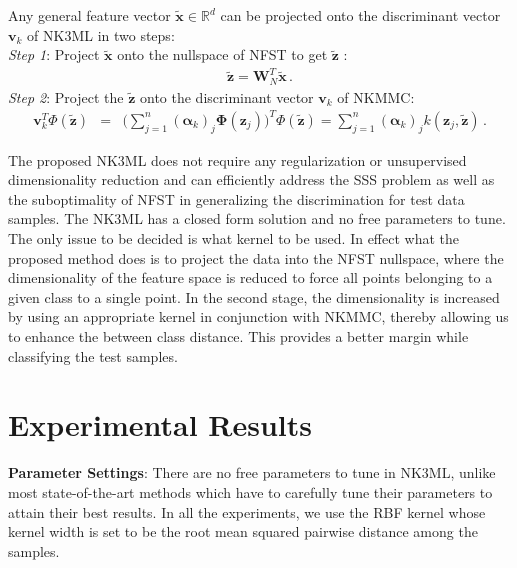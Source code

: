 \documentclass[runningheads]{llncs}
\begin{document}
Any general feature vector $\widetilde{\mathbf{x}} \in \mathbb{R}^d$ can be projected onto the discriminant vector $\mathbf{v}_k$ of NK3ML in two steps:\\
\textit{Step 1}: Project $\widetilde{\mathbf{x}}$ onto the nullspace of NFST to get $\widetilde{\mathbf{z}}$ : 
\begin{eqnarray}
\widetilde{\mathbf{z}} = \mathbf{W}^T_{N} \widetilde{\mathbf{x}} \,.
\end{eqnarray}
\textit{Step 2}: Project the $\widetilde{\mathbf{z}} $ onto the discriminant vector $\mathbf{v}_k$ of NKMMC:
\begin{eqnarray}
\mathbf{v}_k^T \Phi(\widetilde{\mathbf{z}}) &=& \Big( \sum\limits_{j = 1}^{n} (\bm{\alpha}_{k})_j \mathbf{\Phi}(\mathbf{z}_j)\Big)^T \Phi(\widetilde{\mathbf{z}})
= \sum\limits_{j = 1}^{n} (\bm{\alpha}_{k})_j  k(\mathbf{z}_j,\widetilde{\mathbf{z}}) \,.
\end{eqnarray}

The proposed NK3ML does not require any regularization or unsupervised dimensionality reduction and can efficiently address the SSS problem as well as the suboptimality of NFST in generalizing the discrimination for test data samples. The NK3ML has a closed form solution and no free parameters to tune. The only issue to be decided is what kernel to be used. In effect what the proposed method does is to project the data into the NFST nullspace, where the dimensionality of the feature space is reduced to force all points belonging to a given class to a single point. In the second stage, the dimensionality is increased by using an appropriate kernel in conjunction with NKMMC, thereby allowing us to enhance the between class distance. This provides a better margin while classifying the test samples.



\section{Experimental Results}
\label{sec:Exp}
\noindent\textbf{Parameter Settings}: There are no free parameters to tune in NK3ML, unlike most state-of-the-art methods which have to carefully tune their parameters to attain their best results. In all the experiments, we use the RBF kernel whose kernel width is set to be the root mean squared pairwise distance among the samples. 
\end{document}
